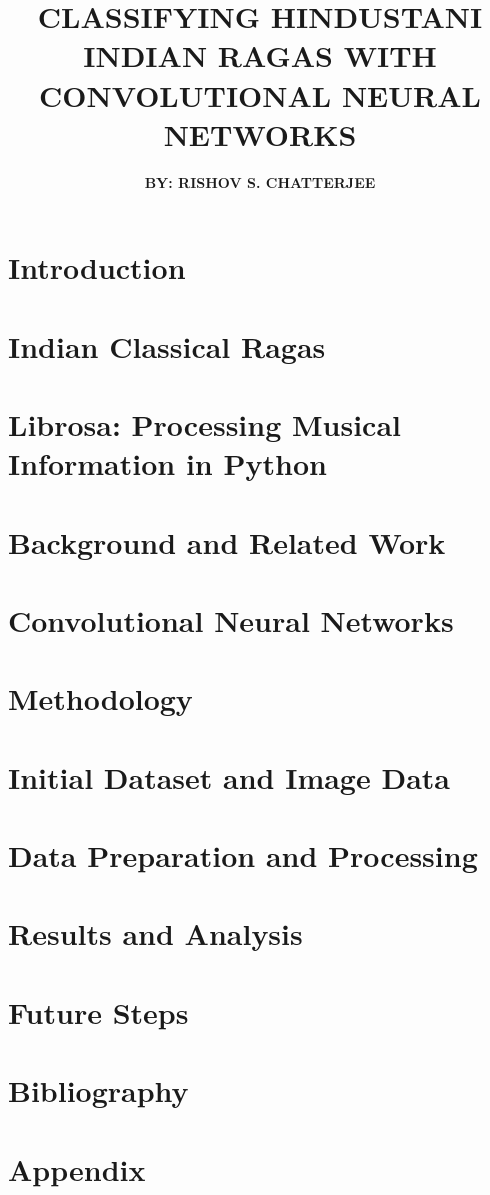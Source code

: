 \documentclass[12pt]{report}
\title{
{\textbf{CLASSIFYING HINDUSTANI INDIAN RAGAS WITH CONVOLUTIONAL NEURAL NETWORKS}}\\
}
\author{\textbf{BY: RISHOV S. CHATTERJEE}}
\begin{document}
\maketitle{}



\chapter*{\centering Introduction}


\chapter*{\centering Indian Classical Ragas}


\chapter*{\centering Librosa: Processing Musical Information in Python}


\chapter*{\centering Background and Related Work}


\chapter*{\centering Convolutional Neural Networks}
 

\chapter*{\centering Methodology}


\chapter*{\centering Initial Dataset and Image Data}


\chapter*{\centering Data Preparation and Processing}


\chapter*{\centering Results and Analysis}


\chapter*{\centering Future Steps}


\chapter*{\centering Bibliography}


\chapter*{\centering Appendix}

\end{document}
